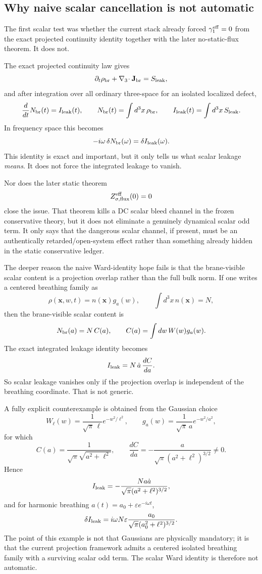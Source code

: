 \documentclass[11pt]{article}
\begin{document}
\subsection{Why naive scalar cancellation is not automatic}
\label{sec:scalar-audit-nonautomatic}

The first scalar test was whether the current stack already forced
\(\gamma_1^{\rm eff}=0\) from the exact projected continuity identity together
with the later no-static-flux theorem.  It does not.

The exact projected continuity law gives
\[
\partial_t\rho_{\rm br}+\nabla_3\!\cdot\mathbf J_{\rm br}=S_{\rm leak},
\]
and after integration over all ordinary three-space for an isolated localized
defect,
\[
\frac{d}{dt}N_{\rm br}(t)=I_{\rm leak}(t),
\qquad
N_{\rm br}(t)=\int d^3x\,\rho_{\rm br},
\qquad
I_{\rm leak}(t)=\int d^3x\,S_{\rm leak}.
\]
In frequency space this becomes
\[
-i\omega\,\delta N_{\rm br}(\omega)=\delta I_{\rm leak}(\omega).
\]
This identity is exact and important, but it only tells us what scalar leakage
\emph{means}.  It does not force the integrated leakage to vanish.

Nor does the later static theorem
\[
Z^{\rm eff}_{\sigma,\mathrm{flux}}(0)=0
\]
close the issue.  That theorem kills a DC scalar bleed channel in the frozen
conservative theory, but it does not eliminate a genuinely dynamical scalar odd
term.  It only says that the dangerous scalar channel, if present, must be an
authentically retarded/open-system effect rather than something already hidden in
the static conservative ledger.

The deeper reason the naive Ward-identity hope fails is that the brane-visible
scalar content is a projection overlap rather than the full bulk norm.  If one
writes a centered breathing family as
\[
\rho(\mathbf x,w,t)=n(\mathbf x)g_a(w),
\qquad
\int d^3x\,n(\mathbf x)=N,
\]
then the brane-visible scalar content is
\[
N_{\rm br}(a)=N\,C(a),
\qquad
C(a)=\int dw\,W(w)g_a(w).
\]
The exact integrated leakage identity becomes
\[
I_{\rm leak}=N\,\dot a\,\frac{dC}{da}.
\]
So scalar leakage vanishes only if the projection overlap is independent of the
breathing coordinate.  That is not generic.

A fully explicit counterexample is obtained from the Gaussian choice
\[
W_\ell(w)=\frac{1}{\sqrt\pi\,\ell}e^{-w^2/\ell^2},
\qquad
g_a(w)=\frac{1}{\sqrt\pi\,a}e^{-w^2/a^2},
\]
for which
\[
C(a)=\frac{1}{\sqrt\pi\sqrt{a^2+\ell^2}},
\qquad
\frac{dC}{da}=-\frac{a}{\sqrt\pi(a^2+\ell^2)^{3/2}}\neq0.
\]
Hence
\[
I_{\rm leak}
=
-\frac{N a\dot a}{\sqrt\pi(a^2+\ell^2)^{3/2}},
\]
and for harmonic breathing \(a(t)=a_0+\varepsilon e^{-i\omega t}\),
\[
\delta I_{\rm leak}
=
i\omega N\varepsilon
\frac{a_0}{\sqrt\pi(a_0^2+\ell^2)^{3/2}}.
\]
The point of this example is not that Gaussians are physically mandatory; it is
that the current projection framework admits a centered isolated breathing family
with a surviving scalar odd term.  The scalar Ward identity is therefore not
automatic.
\end{document}

